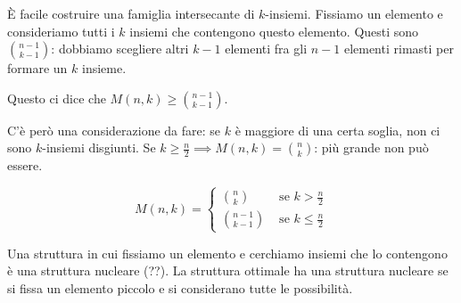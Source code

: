 \`E facile costruire una famiglia intersecante di $k$-insiemi.
Fissiamo un elemento e consideriamo tutti i $k$ insiemi che contengono questo elemento.
Questi sono $\binom{n-1}{k-1}$: dobbiamo scegliere altri $k-1$ elementi fra gli $n-1$ elementi rimasti per formare un $k$ insieme.

Questo ci dice che $M(n,k) \ge \binom{n-1}{k-1}$.

C'\`e per\`o una considerazione da fare: se $k$ \`e maggiore di una certa soglia, non ci sono $k$-insiemi disgiunti.
Se $k \ge \frac{n}{2} \implies M(n,k) = \binom{n}{k}$: pi\`u grande non pu\`o essere.

\begin{theorem}
	\[
		M(n,k) =
		\begin{cases}
			\binom{n}{k} & \text{ se } k > \frac{n}{2} \\
			\binom{n-1}{k-1} & \text{ se } k \le \frac{n}{2}
		\end{cases}
	\]
\end{theorem}
Una struttura in cui fissiamo un elemento e cerchiamo insiemi che lo contengono \`e una struttura nucleare (??).
La struttura ottimale ha una struttura nucleare se si fissa un elemento piccolo e si considerano tutte le possibilit\`a.

